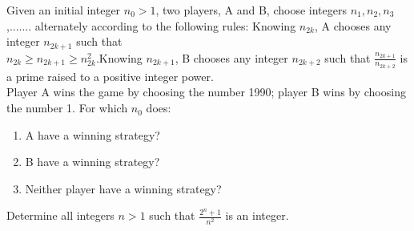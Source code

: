 

\item Given an initial integer $n_0 > 1$, two players, A and B, choose integers $n_1, n_2, n_3$,....... alternately according to the following rules: Knowing $n_{2k}$, A chooses any integer $n_{2k+1}$ such that\\
 $n_{2k} \geq n_{2k+1} \geq n^2_{2k}$.Knowing $n_{2k+1}$, B chooses any integer $n_{2k+2}$ such that $\frac{n_{2k+1}}{n_{2k+2}}$ is a prime raised to a positive integer power.\\
 Player A wins the game by choosing the number 1990; player B wins by choosing
the number 1. For which $n_0$ does:
\begin{enumerate}
\item A have a winning strategy?
\item B have a winning strategy?
\item Neither player have a winning strategy?
\end{enumerate}

\item  Determine all integers $n > 1$ such that $\frac{2^{n} + 1}{n^{2}}$ is an integer.



















